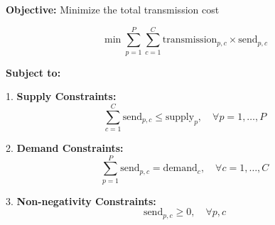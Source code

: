 \documentclass{article}
\begin{document}
\textbf{Objective:} Minimize the total transmission cost

\[
\min \sum_{p=1}^{P} \sum_{c=1}^{C} \text{transmission}_{p,c} \times \text{send}_{p,c}
\]

\textbf{Subject to:}

1. \textbf{Supply Constraints:}
\[
\sum_{c=1}^{C} \text{send}_{p,c} \leq \text{supply}_{p}, \quad \forall p = 1, \ldots, P
\]

2. \textbf{Demand Constraints:}
\[
\sum_{p=1}^{P} \text{send}_{p,c} = \text{demand}_{c}, \quad \forall c = 1, \ldots, C
\]

3. \textbf{Non-negativity Constraints:}
\[
\text{send}_{p,c} \geq 0, \quad \forall p, c
\]
\end{document}
